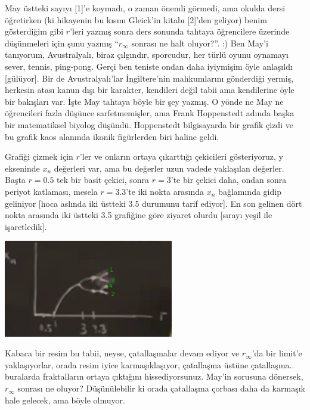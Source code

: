 \documentclass[12pt,fleqn]{article}\usepackage{../../common}
\begin{document}
May üstteki sayıyı [1]'e koymadı, o zaman önemli görmedi, ama okulda dersi
öğretirken (ki hikayenin bu kısmı Gleick'in kitabı [2]'den geliyor) benim
gösterdiğim gibi $r$'leri yazmış sonra ders sonunda tahtaya öğrencilere
üzerinde düşünmeleri için şunu yazmış ``$r_\infty$ sonrası ne halt
oluyor?''. :) Ben May'i tanıyorum, Avustralyalı, biraz çılgındır,
sporcudur, her türlü oyunu oynamayı sever, tennis, ping-pong. Gerçi ben
teniste ondan daha iyiymişim öyle anlaşıldı [gülüyor]. Bir de
Avustralyalı'lar İngiltere'nin mahkumlarını gönderdiği yermiş, herkesin
atası kanun dışı bir karakter, kendileri değil tabii ama kendilerine öyle
bir bakışları var. İşte May tahtaya böyle bir şey yazmış. O yönde ne May ne
öğrencileri fazla düşünce sarfetmemişler, ama Frank Hoppenstedt adında
başka bir matematiksel biyolog düşündü. Hoppenstedt bilgisayarda bir grafik
çizdi ve bu grafik kaos alanında ikonik figürlerden biri haline geldi.

Grafiği çizmek için $r$'ler ve onların ortaya çıkarttığı çekicileri
gösteriyoruz, y ekseninde $x_n$ değerleri var, ama bu değerler uzun vadede
yaklaşılan değerler. Başta $r=0.5$ tek bir basit çekici, sonra $r=3$'te bir
çekici daha, ondan sonra periyot katlaması, mesela $r=3.3$'te iki nokta
arasında $x_n$ bağlamında gidip geliniyor [hoca aslında iki üstteki 3.5
durumunu tarif ediyor]. En son gelinen dört nokta arasında iki üstteki 3.5
grafiğine göre ziyaret olurdu [sırayı yeşil ile işaretledik].

\includegraphics[width=20em]{19_07.png}

Kabaca bir resim bu tabii, neyse, çatallaşmalar devam ediyor ve
$r_\infty$'da bir limit'e yaklaşıyorlar, orada resim iyice karmaşıklaşıyor,
çatallaşma üstüne çatallaşma.. buralarda fraktalların ortaya çıktığını
hissediyorsunuz. May'in sorusuna dönersek, $r_\infty$ sonrası ne oluyor?
Düşünülebilir ki orada çatallaşma çorbası daha da karmaşık hale gelecek,
ama böyle olmuyor. 
\end{document}
